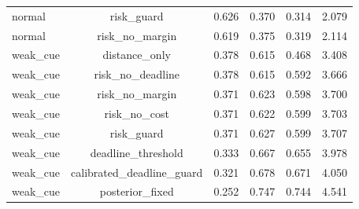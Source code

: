 \begin{table}[t]
\begin{tabular}{lccccc}
normal & risk\_guard & 0.626 & 0.370 & 0.314 & 2.079 \\
normal & risk\_no\_margin & 0.619 & 0.375 & 0.319 & 2.114 \\
weak\_cue & distance\_only & 0.378 & 0.615 & 0.468 & 3.408 \\
weak\_cue & risk\_no\_deadline & 0.378 & 0.615 & 0.592 & 3.666 \\
weak\_cue & risk\_no\_margin & 0.371 & 0.623 & 0.598 & 3.700 \\
weak\_cue & risk\_no\_cost & 0.371 & 0.622 & 0.599 & 3.703 \\
weak\_cue & risk\_guard & 0.371 & 0.627 & 0.599 & 3.707 \\
weak\_cue & deadline\_threshold & 0.333 & 0.667 & 0.655 & 3.978 \\
weak\_cue & calibrated\_deadline\_guard & 0.321 & 0.678 & 0.671 & 4.050 \\
weak\_cue & posterior\_fixed & 0.252 & 0.747 & 0.744 & 4.541 \\
\bottomrule
\end{tabular}
\end{table}
